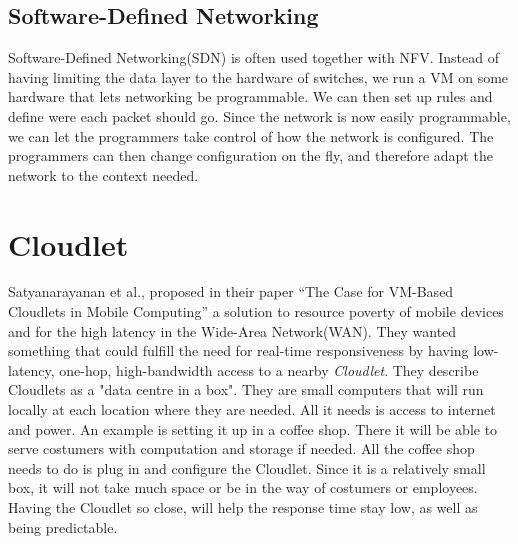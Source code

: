 \subsection{Software-Defined Networking}
Software-Defined Networking(SDN) is often used together with NFV. Instead of having limiting the data layer to the hardware of switches, we run a VM on some hardware that lets networking be programmable. We can then set up rules and define were each packet should go. Since the network is now easily programmable, we can let the programmers take control of how the network is configured. The programmers can then change configuration on the fly, and therefore adapt the network to the context needed.










\section{Cloudlet} \label{section:architecutres_cloudlet} 
Satyanarayanan et al., proposed in their paper “The Case for VM-Based Cloudlets in Mobile Computing”\cite{satyanarayanan_case_2009} a solution to resource poverty of mobile devices and for the high latency in the Wide-Area Network(WAN). They wanted something that could fulfill the need for real-time responsiveness by having low-latency, one-hop, high-bandwidth access to a nearby \textit{Cloudlet}. They describe Cloudlets as a "data centre in a box"\cite{satyanarayanan_case_2009}. They are small computers that will run locally at each location where they are needed. All it needs is access to internet and power. An example is setting it up in a coffee shop. There it will be able to serve costumers with computation and storage if needed. All the coffee shop needs to do is plug in and configure the Cloudlet. Since it is a relatively small box, it will not take much space or be in the way of costumers or employees. Having the Cloudlet so close, will help the response time stay low, as well as being predictable.

